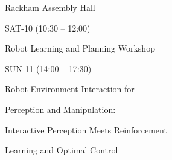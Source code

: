 \documentclass{article}
\begin{document}
\rssheader[2in]

\rssbig
\begin{center}
Rackham Assembly Hall
\end{center}

\vfill

\rssmed
\begin{center}
SAT-10 (10:30 -- 12:00)
\end{center}

\rsssm
\begin{center}
Robot Learning and Planning Workshop
\end{center}

\vfill

\rssmed
\begin{center}
SUN-11 (14:00 -- 17:30)
\end{center}

\rsssm
\begin{center}
Robot-Environment Interaction for \par \noindent Perception and Manipulation:
\par \noindent Interactive Perception Meets Reinforcement \par Learning
\noindent and Optimal Control
\end{center}

\vfill
\end{document}
